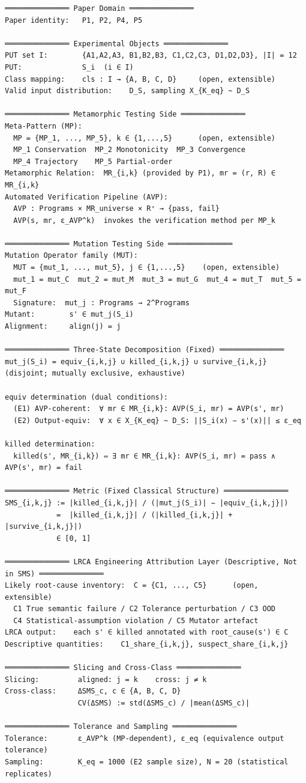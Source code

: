 \documentclass[review,12pt,authoryear]{elsarticle}
\begin{document}
\begin{verbatim}
═══════════════ Paper Domain ═══════════════
Paper identity:   P1, P2, P4, P5

═══════════════ Experimental Objects ═══════════════
PUT set I:        {A1,A2,A3, B1,B2,B3, C1,C2,C3, D1,D2,D3}, |I| = 12
PUT:              S_i  (i ∈ I)
Class mapping:    cls : I → {A, B, C, D}     (open, extensible)
Valid input distribution:    D_S, sampling X_{K_eq} ~ D_S

═══════════════ Metamorphic Testing Side ═══════════════
Meta-Pattern (MP):
  MP = {MP_1, ..., MP_5}, k ∈ {1,...,5}      (open, extensible)
  MP_1 Conservation  MP_2 Monotonicity  MP_3 Convergence
  MP_4 Trajectory    MP_5 Partial-order
Metamorphic Relation:  MR_{i,k} (provided by P1), mr = (r, R) ∈ MR_{i,k}
Automated Verification Pipeline (AVP):
  AVP : Programs × MR_universe × R⁺ → {pass, fail}
  AVP(s, mr, ε_AVP^k)  invokes the verification method per MP_k

═══════════════ Mutation Testing Side ═══════════════
Mutation Operator family (MUT):
  MUT = {mut_1, ..., mut_5}, j ∈ {1,...,5}    (open, extensible)
  mut_1 = mut_C  mut_2 = mut_M  mut_3 = mut_G  mut_4 = mut_T  mut_5 = mut_F
  Signature:  mut_j : Programs → 2^Programs
Mutant:        s' ∈ mut_j(S_i)
Alignment:     align(j) = j

═══════════════ Three-State Decomposition (Fixed) ═══════════════
mut_j(S_i) = equiv_{i,k,j} ∪ killed_{i,k,j} ∪ survive_{i,k,j}    (disjoint; mutually exclusive, exhaustive)

equiv determination (dual conditions):
  (E1) AVP-coherent:  ∀ mr ∈ MR_{i,k}: AVP(S_i, mr) = AVP(s', mr)
  (E2) Output-equiv:  ∀ x ∈ X_{K_eq} ~ D_S: ||S_i(x) − s'(x)|| ≤ ε_eq

killed determination:
  killed(s', MR_{i,k}) ⇔ ∃ mr ∈ MR_{i,k}: AVP(S_i, mr) = pass ∧ AVP(s', mr) = fail

═══════════════ Metric (Fixed Classical Structure) ═══════════════
SMS_{i,k,j} := |killed_{i,k,j}| / (|mut_j(S_i)| − |equiv_{i,k,j}|)
            =  |killed_{i,k,j}| / (|killed_{i,k,j}| + |survive_{i,k,j}|)
            ∈ [0, 1]

═══════════════ LRCA Engineering Attribution Layer (Descriptive, Not in SMS) ═══════════════
Likely root-cause inventory:  C = {C1, ..., C5}      (open, extensible)
  C1 True semantic failure / C2 Tolerance perturbation / C3 OOD
  C4 Statistical-assumption violation / C5 Mutator artefact
LRCA output:    each s' ∈ killed annotated with root_cause(s') ∈ C
Descriptive quantities:    C1_share_{i,k,j}, suspect_share_{i,k,j}

═══════════════ Slicing and Cross-Class ═══════════════
Slicing:         aligned: j = k    cross: j ≠ k
Cross-class:     ΔSMS_c, c ∈ {A, B, C, D}
                 CV(ΔSMS) := std(ΔSMS_c) / |mean(ΔSMS_c)|

═══════════════ Tolerance and Sampling ═══════════════
Tolerance:       ε_AVP^k (MP-dependent), ε_eq (equivalence output tolerance)
Sampling:        K_eq = 1000 (E2 sample size), N = 20 (statistical replicates)
\end{verbatim}
\end{document}
